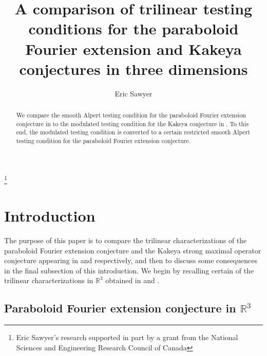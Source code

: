 \documentclass{amsart}%
\theoremstyle{plain}
\numberwithin{equation}{section}
\begin{document}
\title[Comparison of testing conditions]{A comparison of trilinear testing conditions for the paraboloid Fourier
extension and Kakeya conjectures in three dimensions}
\author{Eric Sawyer}
\address{McMaster University\\
Hamilton, Ontario, Canada}
\thanks{Eric Sawyer's research supported in part by a grant from the National Sciences
and Engineering Research Council of Canada}
\maketitle

\begin{abstract}
We compare the smooth Alpert testing condition for the paraboloid Fourier
extension conjecture in \cite{RiSa3} to the modulated testing condition for
the Kakeya conjecture in \cite{RiSa2}. To this end, the modulated testing
condition is converted to a certain restricted smooth Alpert testing condition
for the paraboloid Fourier extension conjecture.

\end{abstract}
\tableofcontents


\section{Introduction}

The purpose of this paper is to compare the trilinear characterizations of the
paraboloid Fourier extension conjecture and the Kakeya strong maximal operator
conjecture appearing in \cite{RiSa3} and \cite{RiSa2} respectively, and then
to discuss some consequences in the final subsection of this introduction. We
begin by recalling certain of the trilinear characterizations in
$\mathbb{R}^{3}$ obtained in \cite{RiSa3} and \cite{RiSa2}.

\subsection{Paraboloid Fourier extension conjecture in $\mathbb{R}^{3}$}
\end{document}
